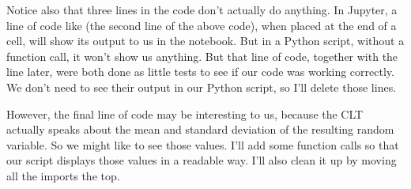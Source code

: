 \documentclass[letterpaper,10pt,english]{jupyterBook}
\begin{document}
\begin{sphinxVerbatim}[commandchars=\\\{\}]
   
  

  
       


   
  \PYG{p}{[}      \PYG{p}{]}
   

     
\end{sphinxVerbatim}

\sphinxAtStartPar
Notice also that three lines in the code don’t actually do anything.  In Jupyter, a line of code like  (the second line of the above code), when placed at the end of a cell, will show its output to us in the notebook.  But in a Python script, without a  function call, it won’t show us anything.  But that line of code, together with the  line later, were both done as little tests to see if our code was working correctly.  We don’t need to see their output in our Python script, so I’ll delete those lines.

\sphinxAtStartPar
However, the final line of code may be interesting to us, because the CLT actually speaks about the mean and standard deviation of the resulting random variable.  So we might like to see those values.  I’ll add some  function calls so that our script displays those values in a readable way.  I’ll also clean it up by moving all the imports the top.
\end{document}
